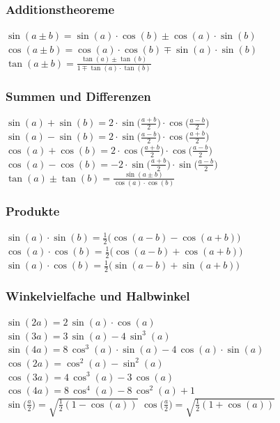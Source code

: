 		

		\subsubsection{Additionstheoreme}
		
		$\sin(a \pm b) = \sin(a) \cdot \cos(b) \pm \cos(a) \cdot \sin(b)$ \\
		$\cos(a \pm b) = \cos(a) \cdot \cos(b) \mp \sin(a) \cdot \sin(b) $ \\
		$\tan(a \pm b) = \frac{\tan(a) \pm \tan(b)}{1 \mp \tan(a) \cdot \tan(b)}$
		
	
		\subsubsection{Summen und Differenzen}
		
		$\sin(a) + \sin(b) = 2 \cdot \sin \big( \frac{a+b}{2} \big) \cdot \cos \big( \frac{a-b}{2} \big)$ \\
		$\sin(a) - \sin(b) = 2 \cdot \sin \big( \frac{a-b}{2} \big) \cdot \cos \big( \frac{a+b}{2} \big)$ \\
		$\cos(a) + \cos(b) = 2 \cdot \cos \big( \frac{a+b}{2} \big) \cdot \cos \big( \frac{a-b}{2} \big)$ \\
		$\cos(a) - \cos(b) = -2 \cdot \sin \big( \frac{a+b}{2} \big) \cdot \sin \big( \frac{a-b}{2} \big)$ \\
		$\tan(a) \pm \tan(b) = \frac{\sin(a \pm b)}{\cos(a) \cdot \cos(b)}$ 
		
			
		
		\subsubsection{Produkte}
		$\sin(a) \cdot \sin(b) = \frac{1}{2} \big( \cos(a-b) - \cos(a+b) \big) $ \\
		$\cos(a) \cdot \cos(b) = \frac{1}{2} \big( \cos(a-b) + \cos(a+b) \big) $ \\	
		$\sin(a) \cdot \cos(b) = \frac{1}{2} \big( \sin(a-b) + \sin(a+b) \big) $ 
			
			
		\subsubsection{Winkelvielfache und Halbwinkel}
		$\sin(2a) = 2 \, \sin(a) \cdot \cos(a)$ \\
		$\sin(3a) = 3 \, \sin(a) -4 \, \sin^3(a)$ \\ 
		$\sin(4a) = 8 \, \cos^3(a) \cdot \sin(a) - 4 \, \cos(a) \cdot \sin(a)$ \\
		\vspace{0.2cm}
		$\cos(2a) = \cos^2(a) - \sin^2(a)$ \\
		$\cos(3a) = 4 \, \cos^3(a) -3 \, \cos(a)$ \\ 
		$\cos(4a) = 8 \, \cos^4(a) - 8 \, \cos^2(a) + 1$ \\
		\vspace{0.2cm}
		$\sin \big( \frac{a}{2} \big) = \sqrt{\frac{1}{2}(1-\cos(a))} $ \qquad $\cos \big( \frac{a}{2} \big) = \sqrt{\frac{1}{2}(1+\cos(a))} $ 
		
